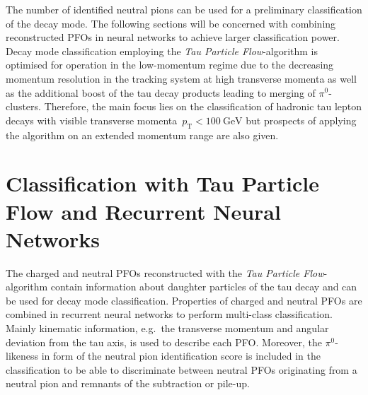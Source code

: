 The number of identified neutral pions can be used for a preliminary
classification of the decay mode. The following sections will be concerned with
combining reconstructed PFOs in neural networks to achieve larger classification
power. Decay mode classification employing the \emph{Tau Particle
  Flow}-algorithm is optimised for operation in the low-momentum regime due to
the decreasing momentum resolution in the tracking system at high transverse
momenta as well as the additional boost of the tau decay products leading to
merging of $\pi^0$-clusters. Therefore, the main focus lies on the
classification of hadronic tau lepton decays with visible transverse
momenta~$p_\text{T} < \SI{100}{\giga\electronvolt}$ but prospects of applying
the algorithm on an extended momentum range are also given.

\section{Classification with Tau Particle Flow and Recurrent Neural Networks}
\label{sec:pfo_general}

The charged and neutral PFOs reconstructed with the \emph{Tau Particle
  Flow}-algorithm contain information about daughter particles of the tau decay
and can be used for decay mode classification. Properties of charged and neutral
PFOs are combined in recurrent neural networks to perform multi-class
classification. Mainly kinematic information, e.g.\ the transverse momentum and
angular deviation from the tau axis, is used to describe each PFO. Moreover, the
$\pi^0$-likeness in form of the neutral pion identification score is included in
the classification to be able to discriminate between neutral PFOs originating
from a neutral pion and remnants of the subtraction or pile-up.

